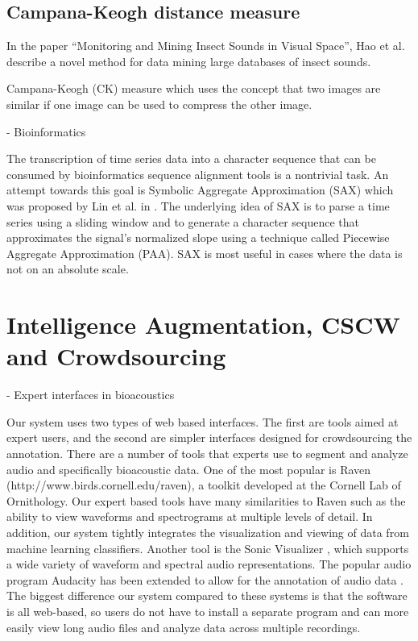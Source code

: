 \subsection{Campana-Keogh distance measure}

In the paper ``Monitoring and Mining Insect Sounds in Visual
Space''\cite{hao12}, Hao et al. describe a novel method for data
mining large databases of insect sounds. 

Campana-Keogh (CK) measure \cite{campana2010} which uses the
concept that two images are similar if one image can be used to
compress the other image. 

- Bioinformatics

The transcription of time series data into a character sequence that
can be consumed by bioinformatics sequence alignment tools is a
nontrivial task.  An attempt towards this goal is Symbolic Aggregate
Approximation (SAX) which was proposed by Lin et al. in
\cite{Lin2003}. The underlying idea of SAX is to parse a time series
using a sliding window and to generate a character sequence that
approximates the signal's normalized slope using a technique called
Piecewise Aggregate Approximation (PAA).  SAX is most useful in cases
where the data is not on an absolute scale.  


\section{Intelligence Augmentation, CSCW and Crowdsourcing}

- Expert interfaces in bioacoustics

Our system uses two types of web based interfaces.  The first are
tools aimed at expert users, and the second are simpler interfaces
designed for crowdsourcing the annotation. There are a number of tools
that experts use to segment and analyze audio and specifically
bioacoustic data.  One of the most popular is Raven
(http://www.birds.cornell.edu/raven), a toolkit developed at the
Cornell Lab of Ornithology.  Our expert based tools have many
similarities to Raven such as the ability to view waveforms and
spectrograms at multiple levels of detail. In addition, our system
tightly integrates the visualization and viewing of data from machine
learning classifiers.  Another tool is the Sonic Visualizer
\cite{cannam10}, which supports a wide variety of waveform and
spectral audio representations. The popular audio program Audacity has
been extended to allow for the annotation of audio data \cite{li06}.
The biggest difference our system compared to these systems is that
the software is all web-based, so users do not have to install a
separate program and can more easily view long audio files and analyze
data across multiple recordings.

